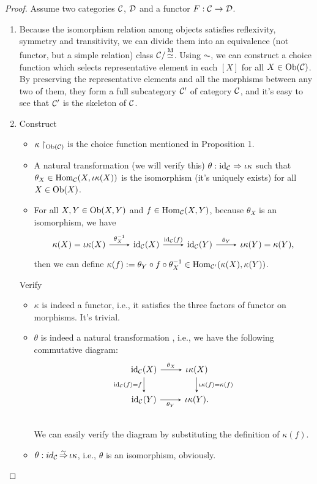 \documentclass{article}
\begin{document}
\begin{proof}
	Assume two categories $\mathcal{C}$, $\mathcal{D}$ and a functor $F:\mathcal{C}\to\mathcal{D}$.
	\begin{enumerate}
		\item Because the isomorphism relation among objects satisfies ref{}lexivity, symmetry and transitivity, we can divide them into an equivalence (not functor, but a simple relation) class $\mathcal{C}/\mathop{\simeq}\limits^\mathrm{M}$. Using $\AC$, we can construct a choice function which selects representative element in each $[X]$ for all $X\in\mathrm{Ob}(\mathcal{C})$. By preserving the representative elements and all the morphisms between any two of them, they form a full subcategory $\mathcal{C}'$ of category $\mathcal{C}$, and it's easy to see that $\mathcal{C}'$ is the skeleton of $\mathcal{C}$.
		
		\item Construct\begin{itemize}
			\item $\kappa\upharpoonright_{\mathrm{Ob}(\mathcal{C})}$ is the choice function mentioned in Proposition 1.
			\item A natural transformation (we will verify this) $\theta:\mathrm{id}_{\mathcal{C}}\Rightarrow\iota\kappa$ such that $\theta_X\in\mathrm{Hom}_{\mathcal{C}}(X,\iota\kappa(X))$ is the isomorphism (it's uniquely exists) for all $X\in\mathrm{Ob}(X)$.
			\item For all $X,Y\in\mathrm{Ob}(X,Y)$ and $f\in\mathrm{Hom}_{\mathcal{C}}(X,Y)$, because $\theta_X$ is an isomorphism, we have
				\[\begin{tikzcd}
					\kappa(X)=\iota\kappa(X) \arrow[->,>=stealth, r, "\theta\iv_X"] &
					\id_\ca(X) \arrow[->,>=stealth, r, "\id_\ca(f)"] &
					\id_\ca(Y) \arrow[->,>=stealth, r, "\theta_Y"] &
					\iota\kappa(Y)=\kappa(Y),
				\end{tikzcd}\]
				then we can define $\kappa(f):=\theta_Y\circ f\circ\theta^{-1}_X\in\mathrm{Hom}_{\mathcal{C}'}(\kappa(X),\kappa(Y))$.
			\end{itemize}
		
			Verify\begin{itemize}
				\item $\kappa$ is indeed a functor, i.e., it satisfies the three factors of functor on morphisms. It's trivial.
				\item $\theta$ is indeed a natural transformation , i.e., we have the following commutative diagram:
				\[\begin{tikzcd}
					\id_\ca(X) \arrow[->,>=stealth,r,"\theta_X"] \arrow[->,>=stealth,d,"\id_\ca(f)=f"'] &
					\iota\kappa(X) \arrow[->,>=stealth,d,"\iota\kappa(f)=\kappa(f)"]\\
					\id_\ca(Y) \arrow[->,>=stealth,r,"\theta_Y"'] & \iota\kappa(Y).\\
				\end{tikzcd}\]
				We can easily verify the diagram by substituting the definition of $\kappa(f)$.
				\item $\theta:id_{\mathcal{C}}\mathop{\Rightarrow}\limits^{\sim}\iota\kappa$, i.e., $\theta$ is an isomorphism, obviously.
			\end{itemize}
			

\end{enumerate}
\end{proof}
\end{document}
